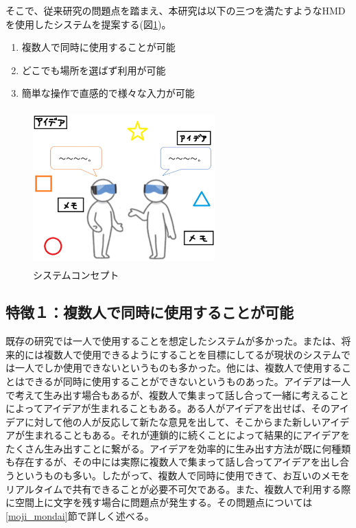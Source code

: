 \documentclass[technicalreport]{ieicej}
\begin{document}
そこで、従来研究の問題点を踏まえ、本研究は以下の三つを満たすようなHMDを使用したシステムを提案する(図\ref{fig:concept})。

\begin{enumerate}
 \item 複数人で同時に使用することが可能
 \item どこでも場所を選ばず利用が可能
 \item 簡単な操作で直感的で様々な入力が可能
\end{enumerate}

\begin{figure}[h]
  \begin{center}
    \includegraphics[clip,height=6.0cm,width=7.0cm]{./concept.eps}
    \caption{システムコンセプト}
    \label{fig:concept}
  \end{center}
\end{figure}

\subsection*{特徴１：複数人で同時に使用することが可能}
既存の研究では一人で使用することを想定したシステムが多かった。または、将来的には複数人で使用できるようにすることを目標にしてるが現状のシステムでは一人でしか使用できないというものも多かった。他には、複数人で使用することはできるが同時に使用することができないというものあった。アイデアは一人で考えて生み出す場合もあるが、複数人で集まって話し合って一緒に考えることによってアイデアが生まれることもある。ある人がアイデアを出せば、そのアイデアに対して他の人が反応して新たな意見を出して、そこからまた新しいアイデアが生まれることもある。それが連鎖的に続くことによって結果的にアイデアをたくさん生み出すことに繋がる。アイデアを効率的に生み出す方法が既に何種類も存在するが、その中には実際に複数人で集まって話し合ってアイデアを出し合うというものも多い。したがって、複数人で同時に使用できて、お互いのメモをリアルタイムで共有できることが必要不可欠である。また、複数人で利用する際に空間上に文字を残す場合に問題点が発生する。その問題点については\ref{moji_mondai}節で詳しく述べる。
\end{document}
